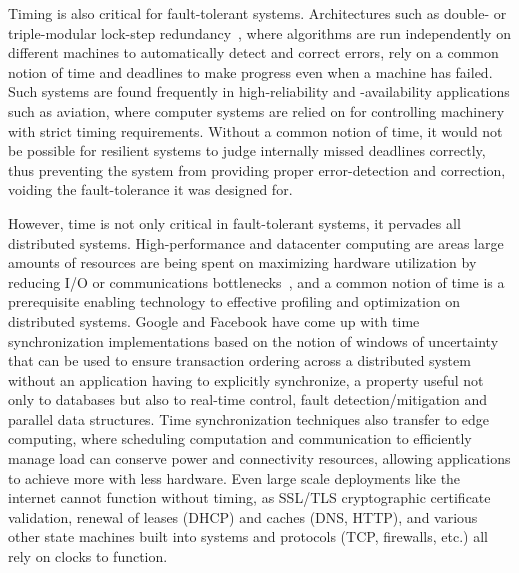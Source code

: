 Timing is also critical for fault-tolerant systems. Architectures such as double- or triple-modular lock-step redundancy~\cite{triple-modular-redundancy,triple-modular-redundancy-evaluation,triple-modular-lock-step-arm}, where algorithms are run independently on different machines to automatically detect and correct errors, rely on a common notion of time and deadlines to make progress even when a machine has failed. Such systems are found frequently in high-reliability and -availability applications such as aviation, where computer systems are relied on for controlling machinery with strict timing requirements.
Without a common notion of time, it would not be possible for resilient systems to judge internally missed deadlines correctly, thus preventing the system from providing proper error-detection and correction, voiding the fault-tolerance it was designed for.

However, time is not only critical in fault-tolerant systems, it pervades all distributed systems.
High-performance and datacenter computing are areas large amounts of resources are being spent on maximizing hardware utilization by reducing I/O or communications bottlenecks~\cite{hpc-understanding-bottlenecks, hpc-solving-io-bottleneck, hpc-diagnosing-io-bottlenecks}, and a common notion of time is a prerequisite enabling technology to effective profiling and optimization on distributed systems.
Google and Facebook have come up with time synchronization implementations based on the notion of windows of uncertainty that can be used to ensure transaction ordering across a distributed system without an application having to explicitly synchronize, a property useful not only to databases but also to real-time control, fault detection/mitigation and parallel data structures.
Time synchronization techniques also transfer to edge computing, where scheduling computation and communication to efficiently manage load can conserve power and connectivity resources, allowing applications to achieve more with less hardware.
Even large scale deployments like the internet cannot function without timing, as SSL/TLS cryptographic certificate validation, renewal of leases (DHCP) and caches (DNS, HTTP), and various other state machines built into systems and protocols (TCP, firewalls, etc.) all rely on clocks to function.

